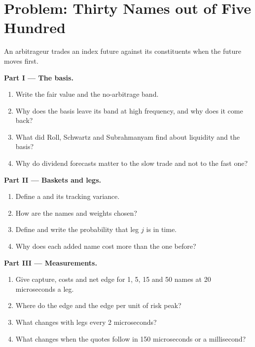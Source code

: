 \section{Problem: Thirty Names out of Five Hundred}

\begin{problem}\label{pb:hf:index-and-basket-arbitrage:1}
An arbitrageur trades an index future against its constituents when the future moves first.

\medskip\noindent\textbf{Part I --- The basis.}
\begin{enumerate}
\item Write the fair value and the no-arbitrage band.
\item Why does the basis leave its band at high frequency, and why does it come back?
\item What did Roll, Schwartz and Subrahmanyam find about liquidity and the basis?
\item Why do dividend forecasts matter to the slow trade and not to the fast one?
\end{enumerate}

\medskip\noindent\textbf{Part II --- Baskets and legs.}
\begin{enumerate}[resume]
\item Define a  and its tracking variance.
\item How are the names and weights chosen?
\item Define  and write the probability that leg $j$ is in time.
\item Why does each added name cost more than the one before?
\end{enumerate}

\medskip\noindent\textbf{Part III --- Measurements.}
\begin{enumerate}[resume]
\item Give capture, costs and net edge for 1, 5, 15 and 50 names at 20 microseconds a leg.
\item Where do the edge and the edge per unit of risk peak?
\item What changes with legs every 2 microseconds?
\item What changes when the quotes follow in 150 microseconds or a millisecond?
\end{enumerate}


\end{problem}
